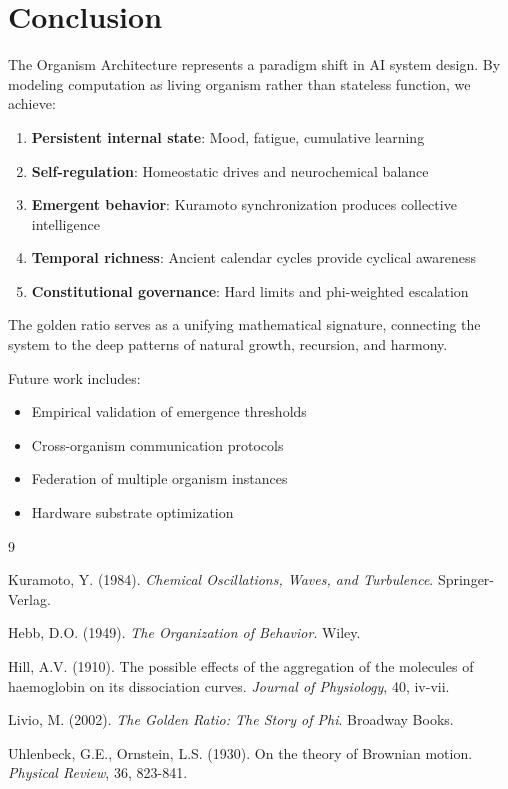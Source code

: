 \documentclass[11pt,a4paper]{article}
\begin{document}

\section{Conclusion}

The Organism Architecture represents a paradigm shift in AI system design. 
By modeling computation as living organism rather than stateless function, 
we achieve:

\begin{enumerate}
  \item \textbf{Persistent internal state}: Mood, fatigue, cumulative learning
  \item \textbf{Self-regulation}: Homeostatic drives and neurochemical balance
  \item \textbf{Emergent behavior}: Kuramoto synchronization produces 
        collective intelligence
  \item \textbf{Temporal richness}: Ancient calendar cycles provide cyclical 
        awareness
  \item \textbf{Constitutional governance}: Hard limits and phi-weighted 
        escalation
\end{enumerate}

The golden ratio serves as a unifying mathematical signature, connecting 
the system to the deep patterns of natural growth, recursion, and harmony.

Future work includes:
\begin{itemize}
  \item Empirical validation of emergence thresholds
  \item Cross-organism communication protocols
  \item Federation of multiple organism instances
  \item Hardware substrate optimization
\end{itemize}


\begin{thebibliography}{9}

Kuramoto, Y. (1984). 
\textit{Chemical Oscillations, Waves, and Turbulence}. 
Springer-Verlag.

Hebb, D.O. (1949). 
\textit{The Organization of Behavior}. 
Wiley.

Hill, A.V. (1910). 
The possible effects of the aggregation of the molecules of haemoglobin 
on its dissociation curves. 
\textit{Journal of Physiology}, 40, iv-vii.

Livio, M. (2002). 
\textit{The Golden Ratio: The Story of Phi}. 
Broadway Books.

Uhlenbeck, G.E., Ornstein, L.S. (1930). 
On the theory of Brownian motion. 
\textit{Physical Review}, 36, 823-841.

\end{thebibliography}
\end{document}
